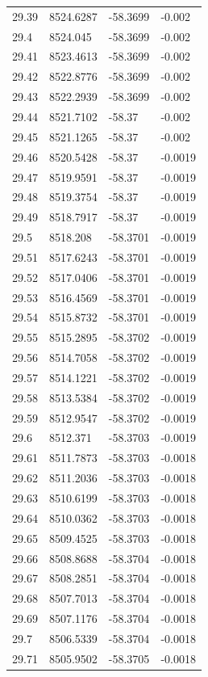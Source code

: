\begin{table}[H]
\begin{tabular}{llll}
29.39 & 8524.6287 & -58.3699 & -0.002 \\
29.4 & 8524.045 & -58.3699 & -0.002 \\
29.41 & 8523.4613 & -58.3699 & -0.002 \\
29.42 & 8522.8776 & -58.3699 & -0.002 \\
29.43 & 8522.2939 & -58.3699 & -0.002 \\
29.44 & 8521.7102 & -58.37 & -0.002 \\
29.45 & 8521.1265 & -58.37 & -0.002 \\
29.46 & 8520.5428 & -58.37 & -0.0019 \\
29.47 & 8519.9591 & -58.37 & -0.0019 \\
29.48 & 8519.3754 & -58.37 & -0.0019 \\
29.49 & 8518.7917 & -58.37 & -0.0019 \\
29.5 & 8518.208 & -58.3701 & -0.0019 \\
29.51 & 8517.6243 & -58.3701 & -0.0019 \\
29.52 & 8517.0406 & -58.3701 & -0.0019 \\
29.53 & 8516.4569 & -58.3701 & -0.0019 \\
29.54 & 8515.8732 & -58.3701 & -0.0019 \\
29.55 & 8515.2895 & -58.3702 & -0.0019 \\
29.56 & 8514.7058 & -58.3702 & -0.0019 \\
29.57 & 8514.1221 & -58.3702 & -0.0019 \\
29.58 & 8513.5384 & -58.3702 & -0.0019 \\
29.59 & 8512.9547 & -58.3702 & -0.0019 \\
29.6 & 8512.371 & -58.3703 & -0.0019 \\
29.61 & 8511.7873 & -58.3703 & -0.0018 \\
29.62 & 8511.2036 & -58.3703 & -0.0018 \\
29.63 & 8510.6199 & -58.3703 & -0.0018 \\
29.64 & 8510.0362 & -58.3703 & -0.0018 \\
29.65 & 8509.4525 & -58.3703 & -0.0018 \\
29.66 & 8508.8688 & -58.3704 & -0.0018 \\
29.67 & 8508.2851 & -58.3704 & -0.0018 \\
29.68 & 8507.7013 & -58.3704 & -0.0018 \\
29.69 & 8507.1176 & -58.3704 & -0.0018 \\
29.7 & 8506.5339 & -58.3704 & -0.0018 \\
29.71 & 8505.9502 & -58.3705 & -0.0018 \\

\end{tabular}
\end{table}
